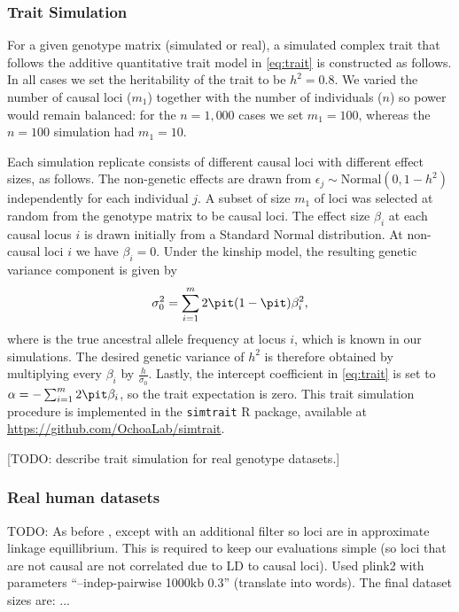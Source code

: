 \documentclass[11pt]{article}
\begin{document}
\subsubsection{Trait Simulation}

For a given genotype matrix (simulated or real), a simulated complex trait that follows the additive quantitative trait model in \cref{eq:trait} is constructed as follows.
In all cases we set the heritability of the trait to be $h^2 = 0.8$.
We varied the number of causal loci ($m_1$) together with the number of individuals ($n$) so power would remain balanced:
for the $n = 1,000$ cases we set $m_1 = 100$, whereas the $n = 100$ simulation had $m_1 = 10$.

Each simulation replicate consists of different causal loci with different effect sizes, as follows.
The non-genetic effects are drawn from $\epsilon_j \sim \text{Normal}(0, 1 - h^2 )$ independently for each individual $j$.
A subset of size $m_1$ of loci was selected at random from the genotype matrix to be causal loci.
The effect size $\beta_i$ at each causal locus $i$ is drawn initially from a Standard Normal distribution.
At non-causal loci $i$ we have $\beta_i = 0$.
Under the kinship model, the resulting genetic variance component is given by
$$
\sigma^2_0
=
\sum_{i = 1}^m 2 \pit ( 1 - \pit ) \beta_i^2 ,
$$
where \pit is the true ancestral allele frequency at locus $i$, which is known in our simulations.
The desired genetic variance of $h^2$ is therefore obtained by multiplying every $\beta_i$ by $\frac{h}{ \sigma_0 }$.
Lastly, the intercept coefficient in \cref{eq:trait} is set to $\alpha = - \sum_{i=1}^m 2 \pit \beta_i$, so the trait expectation is zero.
This trait simulation procedure is implemented in the \texttt{simtrait} R package, available at
\url{https://github.com/OchoaLab/simtrait}.

[TODO: describe trait simulation for real genotype datasets.]

\subsubsection{Real human datasets}

TODO: 
As before \citep{ochoa_human}, except with an additional filter so loci are in approximate linkage equillibrium.
This is required to keep our evaluations simple (so loci that are not causal are not correlated due to LD to causal loci).
Used plink2 with parameters ``--indep-pairwise 1000kb 0.3'' (translate into words).
The final dataset sizes are:
...
\end{document}
